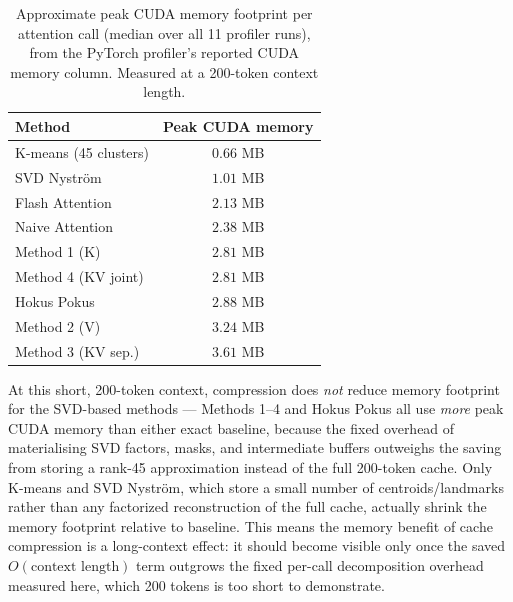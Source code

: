 \begin{table}[ht]
\centering
\caption{Approximate peak CUDA memory footprint per attention call (median over all 11
profiler runs), from the PyTorch profiler's reported CUDA memory column.
Measured at a 200-token context length.}
\label{tab:profiling_mem}
\begin{tabular}{l c}
\toprule
Method & Peak CUDA memory \\
\midrule
K-means (45 clusters) & $0.66$ MB \\
SVD Nyström           & $1.01$ MB \\
Flash Attention       & $2.13$ MB \\
Naive Attention       & $2.38$ MB \\
Method 1 (K)          & $2.81$ MB \\
Method 4 (KV joint)   & $2.81$ MB \\
Hokus Pokus           & $2.88$ MB \\
Method 2 (V)          & $3.24$ MB \\
Method 3 (KV sep.)    & $3.61$ MB \\
\bottomrule
\end{tabular}
\end{table}

\noindent At this short, 200-token context, compression does \emph{not} reduce memory
footprint for the SVD-based methods --- Methods 1--4 and Hokus Pokus all use \emph{more}
peak CUDA memory than either exact baseline, because the fixed overhead of materialising
SVD factors, masks, and intermediate buffers outweighs the saving from storing a rank-45
approximation instead of the full 200-token cache. Only K-means and SVD Nyström, which store
a small number of centroids/landmarks rather than any factorized reconstruction of the full
cache, actually shrink the memory footprint relative to baseline. This means the memory
benefit of cache compression is a long-context effect: it should become visible only once the
saved $O(\text{context length})$ term outgrows the fixed per-call decomposition overhead
measured here, which 200 tokens is too short to demonstrate.


